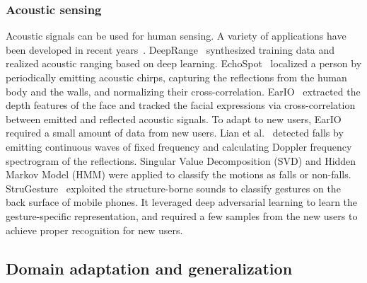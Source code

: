 \documentclass[journal]{IEEEtran}
\begin{document}
\subsubsection{Acoustic sensing}
Acoustic signals can be used for human sensing. A variety of applications have been developed in recent years~\cite{CaiC:2022}. 
DeepRange~\cite{MaoW:2020} synthesized training data and realized acoustic ranging based on deep learning. 
EchoSpot~\cite{LianJEchoSpot:2021} localized a person by periodically emitting acoustic chirps, capturing the reflections from the human body and the walls, and normalizing their cross-correlation. 
EarIO~\cite{LiK:2022} extracted the depth features of the face and tracked the facial expressions via cross-correlation between emitted and reflected acoustic signals. To adapt to new users, EarIO required a small amount of data from new users.
Lian et al.~\cite{LianJ:2021} detected falls by emitting continuous waves of fixed frequency and calculating Doppler frequency spectrogram of the reflections. Singular Value Decomposition (SVD) and Hidden Markov Model (HMM) were applied to classify the motions as falls or non-falls. 
StruGesture~\cite{WangL:2021} exploited the structure-borne sounds to classify gestures on the back surface of mobile phones. It leveraged deep adversarial learning to learn the gesture-specific representation, and required a few samples from the new users to achieve proper recognition for new users.

\subsection{Domain adaptation and generalization}
\end{document}
